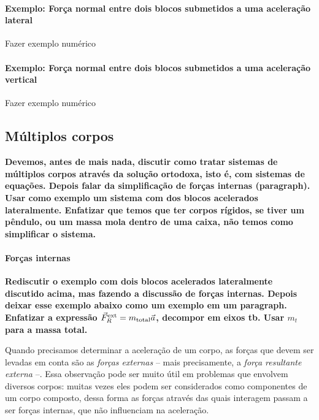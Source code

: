 \paragraph{Exemplo: Força normal entre dois blocos submetidos a uma aceleração lateral}

\textrm{Fazer exemplo numérico}

\paragraph{Exemplo: Força normal entre dois blocos submetidos a uma aceleração vertical}

\textrm{Fazer exemplo numérico}

\subsection{Múltiplos corpos}

\textbf{Devemos, antes de mais nada, discutir como tratar sistemas de múltiplos corpos através da solução ortodoxa, isto é, com sistemas de equações. Depois falar da simplificação de forças internas (paragraph). Usar como exemplo um sistema com dos blocos acelerados lateralmente. Enfatizar que temos que ter corpos rígidos, se tiver um pêndulo, ou um massa mola dentro de uma caixa, não temos como simplificar o sistema.}

\paragraph{Forças internas}

\textbf{Rediscutir o exemplo com dois blocos acelerados lateralmente discutido acima, mas fazendo a discussão de forças internas. Depois deixar esse exemplo abaixo como um exemplo em um paragraph. Enfatizar a expressão $\vec{F}_R^{\rm{ext}} = m_{\rm{total}} \vec{a}$, decompor em eixos tb. Usar $m_t$ para a massa total.}

Quando precisamos determinar a aceleração de um corpo, as forças que devem ser levadas em conta são as \emph{forças externas} -- mais precisamente, a \emph{força resultante externa} --. Essa observação pode ser muito útil em problemas que envolvem diversos corpos: muitas vezes eles podem ser considerados como componentes de um corpo composto, dessa forma as forças através das quais interagem passam a ser forças internas, que não influenciam na aceleração.

